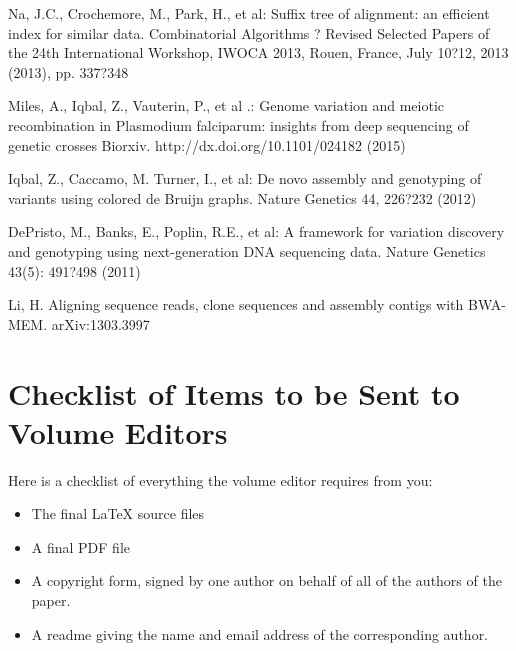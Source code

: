 \documentclass[runningheads,a4paper]{llncs}
\begin{document}
\begin{thebibliography}{4}
 Na, J.C., Crochemore, M., Park, H.,  et al: Suffix tree of alignment: an efficient index for similar data. Combinatorial Algorithms ? Revised Selected Papers of the 24th International Workshop, IWOCA 2013, Rouen, France, July 10?12, 2013 (2013), pp. 337?348

 Miles, A., Iqbal, Z., Vauterin, P., et al .: Genome variation and meiotic recombination in Plasmodium falciparum: insights from deep sequencing of genetic crosses Biorxiv. http://dx.doi.org/10.1101/024182 (2015)

 Iqbal, Z., Caccamo, M. Turner, I.,  et al: De novo assembly and genotyping of variants using colored de Bruijn graphs. Nature Genetics  44, 226?232 (2012)

 DePristo, M., Banks, E., Poplin, R.E., et al: A framework for variation discovery and genotyping using next-generation DNA sequencing data. Nature Genetics 43(5): 491?498 (2011)

 Li, H. Aligning sequence reads, clone sequences and assembly contigs with BWA-MEM. 	arXiv:1303.3997


\end{thebibliography}


\section{Checklist of Items to be Sent to Volume Editors}
Here is a checklist of everything the volume editor requires from you:


\begin{itemize}
\settowidth{\leftmargin}{{\Large$\square$}}\advance\leftmargin{}
\itemsep8pt\relax
\renewcommand\labelitemi{{\lower1.5pt\hbox{\Large$\square$}}}

\item The final \LaTeX{} source files
\item A final PDF file
\item A copyright form, signed by one author on behalf of all of the
authors of the paper.
\item A readme giving the name and email address of the
corresponding author.
\end{itemize}
\end{document}
